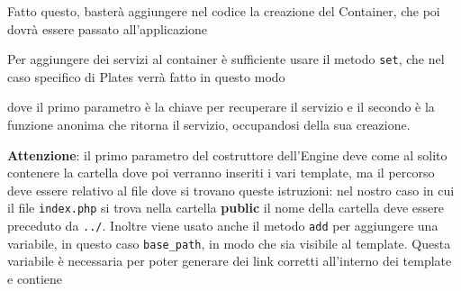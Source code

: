 Fatto questo, basterà aggiungere nel codice la creazione del Container,
che poi dovrà essere passato all'applicazione

\begin{Shaded}
\begin{Highlighting}[]
 \OperatorTok{=}  \OtherTok{;}
\NormalTok{)}\OtherTok{;}
\end{Highlighting}
\end{Shaded}

Per aggiungere dei servizi al container è sufficiente usare il metodo
\texttt{set}, che nel caso specifico di Plates verrà fatto in questo
modo

\begin{Shaded}
\begin{Highlighting}[]
\OtherTok{,} \NormalTok{ ()\{}
     \OperatorTok{=}  \OtherTok{,} \NormalTok{)}\OtherTok{;}
    \NormalTok{{-}\textgreater{}addData([}\NormalTok{ =\textgreater{} }\NormalTok{])}\OtherTok{;}
     \OtherTok{;}
\NormalTok{\})}\OtherTok{;}
\end{Highlighting}
\end{Shaded}

dove il primo parametro è la chiave per recuperare il servizio e il
secondo è la funzione anonima che ritorna il servizio, occupandosi della
sua creazione.

\textbf{Attenzione}: il primo parametro del costruttore dell'Engine deve
come al solito contenere la cartella dove poi verranno inseriti i vari
template, ma il percorso deve essere relativo al file dove si trovano
queste istruzioni: nel nostro caso in cui il file \texttt{index.php} si
trova nella cartella \textbf{public} il nome della cartella deve essere
preceduto da \texttt{../}. Inoltre viene usato anche il metodo
\texttt{add} per aggiungere una variabile, in questo caso
\texttt{base\_path}, in modo che sia visibile al template. Questa
variabile è necessaria per poter generare dei link corretti all'interno
dei template e contiene

